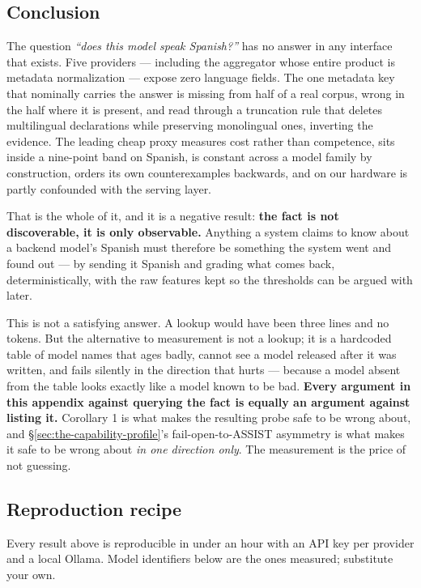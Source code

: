 \subsection{Conclusion}
\label{sec:appendix-conclusion}

The question \emph{``does this model speak Spanish?''} has no answer in any
interface that exists. Five providers --- including the aggregator whose entire
product is metadata normalization --- expose zero language fields. The one
metadata key that nominally carries the answer is missing from half of a real
corpus, wrong in the half where it is present, and read through a truncation rule
that deletes multilingual declarations while preserving monolingual ones,
inverting the evidence. The leading cheap proxy measures cost rather than
competence, sits inside a nine-point band on Spanish, is constant across a model
family by construction, orders its own counterexamples backwards, and on our
hardware is partly confounded with the serving layer.

That is the whole of it, and it is a negative result: \textbf{the fact is not
discoverable, it is only observable.} Anything a system claims to know about a
backend model's Spanish must therefore be something the system went and found out
--- by sending it Spanish and grading what comes back, deterministically, with
the raw features kept so the thresholds can be argued with later.

This is not a satisfying answer. A lookup would have been three lines and no
tokens. But the alternative to measurement is not a lookup; it is a hardcoded
table of model names that ages badly, cannot see a model released after it was
written, and fails silently in the direction that hurts --- because a model
absent from the table looks exactly like a model known to be bad.
\textbf{Every argument in this appendix against querying the fact is equally an
argument against listing it.} Corollary 1 is what makes the resulting probe safe
to be wrong about, and \S\ref{sec:the-capability-profile}'s fail-open-to-ASSIST
asymmetry is what makes it safe to be wrong about \emph{in one direction only}.
The measurement is the price of not guessing.

\subsection{Reproduction recipe}
\label{sec:appendix-reproduction}

Every result above is reproducible in under an hour with an API key per provider
and a local Ollama. Model identifiers below are the ones measured; substitute
your own.

